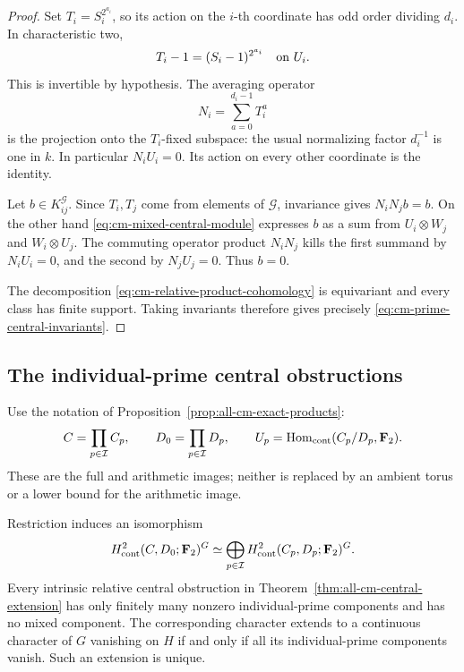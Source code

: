 \begin{proof}
Set \(T_i=S_i^{2^{a_i}}\), so its action on the \(i\)-th
coordinate has odd order dividing \(d_i\). In characteristic two,
\[
 T_i-1=(S_i-1)^{2^{a_i}}
                    \quad\hbox{on }U_i.
\]
This is invertible by hypothesis. The averaging operator
\[
 N_i=\sum_{a=0}^{d_i-1}T_i^a
\]
is the projection onto the \(T_i\)-fixed subspace: the usual
normalizing factor \(d_i^{-1}\) is one in \(k\). In particular
\(N_iU_i=0\). Its action on every other coordinate is the identity.

Let \(b\in K_{ij}^{\mathcal G}\). Since \(T_i,T_j\) come
from elements of \(\mathcal G\), invariance gives
\(N_iN_jb=b\). On the other hand \eqref{eq:cm-mixed-central-module} expresses \(b\) as
a sum from \(U_i\otimes W_j\) and \(W_i\otimes U_j\).
The commuting operator product \(N_iN_j\) kills the first
summand by \(N_iU_i=0\), and the second by \(N_jU_j=0\).
Thus \(b=0\).

The decomposition \eqref{eq:cm-relative-product-cohomology} is equivariant and every class has finite
support. Taking invariants therefore gives precisely \eqref{eq:cm-prime-central-invariants}.
\end{proof}

\subsection{The individual-prime central obstructions}

Use the notation of Proposition~\ref{prop:all-cm-exact-products}:
\[
 C=\prod_{p\in\mathcal I}C_p,\qquad
 D_0=\prod_{p\in\mathcal I}D_p,\qquad
 U_p=\operatorname{Hom}_{\rm cont}(C_p/D_p,\mathbf F_2).
\]
These are the full and arithmetic images; neither is replaced
by an ambient torus or a lower bound for the arithmetic image.

\begin{corollary}\label{cor:cm-individual-central-obstructions}
Restriction induces an isomorphism
\[
 H^2_{\rm cont}(C,D_0;\mathbf F_2)^G
 \simeq
 \bigoplus_{p\in\mathcal I}
       H^2_{\rm cont}(C_p,D_p;\mathbf F_2)^G.
\]
Every intrinsic relative central obstruction in
Theorem~\ref{thm:all-cm-central-extension} has only finitely many
nonzero individual-prime components and has no mixed component.
The corresponding character extends to a continuous character of
\(G\) vanishing on \(H\) if and only if all its individual-prime
components vanish. Such an extension is unique.
\end{corollary}

